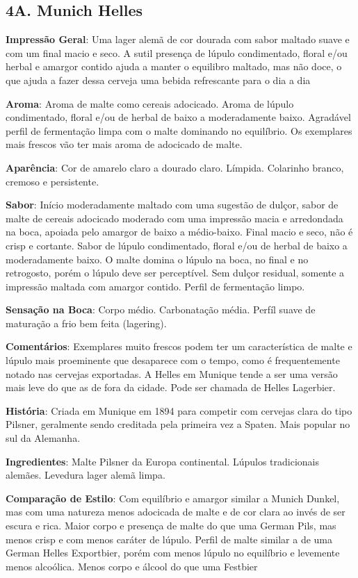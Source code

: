 \subsection*{4A. Munich Helles}

\textbf{Impressão Geral}: Uma lager alemã de cor dourada com sabor maltado suave e com um final macio e seco. A sutil presença de lúpulo condimentado, floral e/ou herbal e amargor contido ajuda a manter o equilibro maltado, mas não doce, o que ajuda a fazer dessa cerveja uma bebida refrescante para o dia a dia

\textbf{Aroma}: Aroma de malte como cereais adocicado. Aroma de lúpulo condimentado, floral e/ou de herbal de baixo a moderadamente baixo. Agradável perfil de fermentação limpa com o malte dominando no equilíbrio. Os exemplares mais frescos vão ter mais aroma de adocicado de malte.

\textbf{Aparência}: Cor de amarelo claro a dourado claro. Límpida. Colarinho branco, cremoso e persistente.

\textbf{Sabor}: Início moderadamente maltado com uma sugestão de dulçor, sabor de malte de cereais adocicado moderado com uma impressão macia e arredondada na boca, apoiada pelo amargor de baixo a médio-baixo. Final macio e seco, não é crisp e cortante. Sabor de lúpulo condimentado, floral e/ou de herbal de baixo a moderadamente baixo. O malte domina o lúpulo na boca, no final e no retrogosto, porém o lúpulo deve ser perceptível. Sem dulçor residual, somente a impressão maltada com amargor contido. Perfil de fermentação limpo.

\textbf{Sensação na Boca}: Corpo médio. Carbonatação média. Perfíl suave de maturação a frio bem feita (lagering).

\textbf{Comentários}: Exemplares muito frescos podem ter um característica de malte e lúpulo mais proeminente que desaparece com o tempo, como é frequentemente notado nas cervejas exportadas. A Helles em Munique tende a ser uma versão mais leve do que as de fora da cidade. Pode ser chamada de Helles Lagerbier.

\textbf{História}: Criada em Munique em 1894 para competir com cervejas clara do tipo Pilsner, geralmente sendo creditada pela primeira vez a Spaten. Mais popular no sul da Alemanha.

\textbf{Ingredientes}: Malte Pilsner da Europa continental. Lúpulos tradicionais alemães. Levedura lager alemã limpa.

\textbf{Comparação de Estilo}: Com equilíbrio e amargor similar a Munich Dunkel, mas com uma natureza menos adocicada de malte e de cor clara ao invés de ser escura e rica. Maior corpo e presença de malte do que uma German Pils, mas menos crisp e com menos caráter de lúpulo. Perfil de malte similar a de uma German Helles Exportbier, porém com menos lúpulo no equilíbrio e levemente menos alcoólica. Menos corpo e álcool do que uma Festbier

